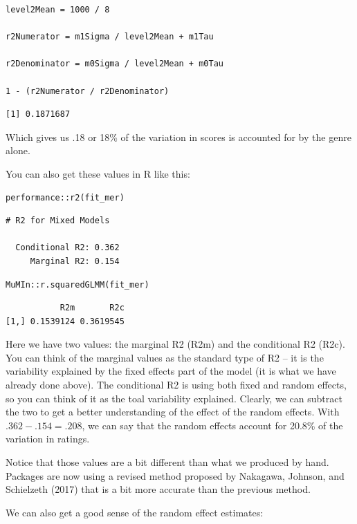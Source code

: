 \documentclass[
  letterpaper,
]{krantz}
\begin{document}
\begin{verbatim}
level2Mean = 1000 / 8

r2Numerator = m1Sigma / level2Mean + m1Tau

r2Denominator = m0Sigma / level2Mean + m0Tau

1 - (r2Numerator / r2Denominator)
\end{verbatim}

\begin{verbatim}
[1] 0.1871687
\end{verbatim}

Which gives us .18 or 18\% of the variation in scores is accounted for
by the genre alone.

You can also get these values in R like this:

\begin{verbatim}
performance::r2(fit_mer)
\end{verbatim}

\begin{verbatim}
# R2 for Mixed Models

  Conditional R2: 0.362
     Marginal R2: 0.154
\end{verbatim}

\begin{verbatim}
MuMIn::r.squaredGLMM(fit_mer)
\end{verbatim}

\begin{verbatim}
           R2m       R2c
[1,] 0.1539124 0.3619545
\end{verbatim}

Here we have two values: the marginal R2 (R2m) and the conditional R2
(R2c). You can think of the marginal values as the standard type of R2
-- it is the variability explained by the fixed effects part of the
model (it is what we have already done above). The conditional R2 is
using both fixed and random effects, so you can think of it as the toal
variability explained. Clearly, we can subtract the two to get a better
understanding of the effect of the random effects. With
\(.362 - .154 = .208\), we can say that the random effects account for
20.8\% of the variation in ratings.

Notice that those values are a bit different than what we produced by
hand. Packages are now using a revised method proposed by Nakagawa,
Johnson, and Schielzeth (2017) that is a bit more accurate than the
previous method.

We can also get a good sense of the random effect estimates:
\end{document}
